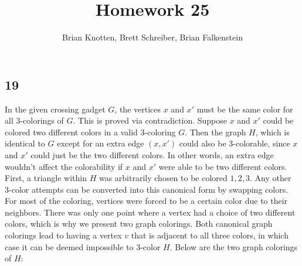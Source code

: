 \documentclass[letterpaper,notitlepage,twoside]{article}
\begin{document}
\title{Homework 25}
\author{Brian Knotten, Brett Schreiber, Brian Falkenstein}
\maketitle
\subsection*{19}
In the given crossing gadget $G$, the vertices $x$ and $x'$ must be the same color for all 3-colorings of $G$. This is proved via contradiction. Suppose $x$ and $x'$ could be colored two different colors in a valid 3-coloring $G$. Then the graph $H$, which is identical to $G$ except for an extra edge $(x, x')$ could also be 3-colorable, since $x$ and $x'$ could just be the two different colors. In other words, an extra edge wouldn't affect the colorability if $x$ and $x'$ were able to be two different colors.
\\
First, a triangle within $H$ was arbitrarily chosen to be colored $1, 2, 3$. Any other 3-color attempts can be converted into this canonical form by swapping colors. For most of the coloring, vertices were forced to be a certain color due to their neighbors. There was only one point where a vertex had a choice of two different colors, which is why we present two graph colorings. Both canonical graph colorings lead to having a vertex $v$ that is adjacent to all three colors, in which case it can be deemed impossible to 3-color $H$. Below are the two graph colorings of $H$:
\\
\end{document}
